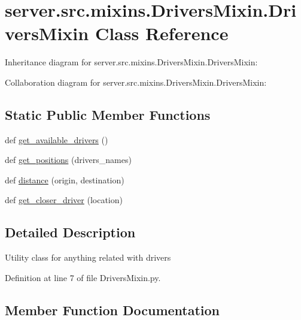 \hypertarget{classserver_1_1src_1_1mixins_1_1_drivers_mixin_1_1_drivers_mixin}{}\section{server.\+src.\+mixins.\+Drivers\+Mixin.\+Drivers\+Mixin Class Reference}
\label{classserver_1_1src_1_1mixins_1_1_drivers_mixin_1_1_drivers_mixin}


Inheritance diagram for server.\+src.\+mixins.\+Drivers\+Mixin.\+Drivers\+Mixin\+:


Collaboration diagram for server.\+src.\+mixins.\+Drivers\+Mixin.\+Drivers\+Mixin\+:
\subsection*{Static Public Member Functions}
\begin{DoxyCompactItemize}
\item 
def \hyperlink{classserver_1_1src_1_1mixins_1_1_drivers_mixin_1_1_drivers_mixin_aaef958c00db5a53f29c2209b426d9c24}{get\+\_\+available\+\_\+drivers} ()
\item 
def \hyperlink{classserver_1_1src_1_1mixins_1_1_drivers_mixin_1_1_drivers_mixin_aaf06d428e440fb9ba180c813df5e3cc5}{get\+\_\+positions} (drivers\+\_\+names)
\item 
def \hyperlink{classserver_1_1src_1_1mixins_1_1_drivers_mixin_1_1_drivers_mixin_a3ee640d7f5dec7f1be15c71eb00ffec3}{distance} (origin, destination)
\item 
def \hyperlink{classserver_1_1src_1_1mixins_1_1_drivers_mixin_1_1_drivers_mixin_ae5eb4c950a76c083e6ee845897c49a69}{get\+\_\+closer\+\_\+driver} (location)
\end{DoxyCompactItemize}


\subsection{Detailed Description}
\begin{DoxyVerb}Utility class for anything related with drivers\end{DoxyVerb}
 

Definition at line 7 of file Drivers\+Mixin.\+py.



\subsection{Member Function Documentation}
